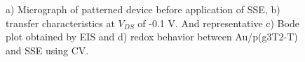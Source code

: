 \begin{figure}[ht]
    \centering
	\hspace{3em}    
    \qquad
    \caption[Performance of solid-OECT with drop-casted SSE]{a) Micrograph of patterned device before application of SSE, b) transfer characteristics at $V_{DS}$ of -0.1 V. And representative c) Bode plot obtained by EIS and d) redox behavior between Au/p(g3T2-T) and SSE using CV.}
    \label{fig:dropcast}
\end{figure}

